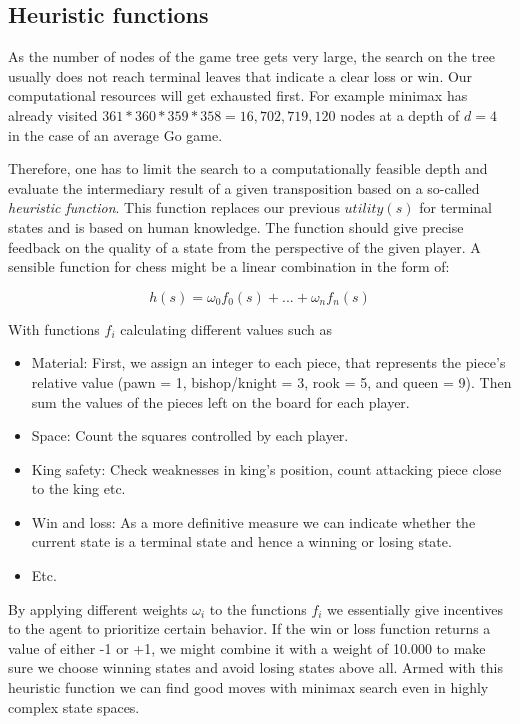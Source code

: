 \subsection{Heuristic functions}
As the number of nodes of the game tree gets very large, the search on the tree usually does not reach terminal leaves that indicate a clear loss or win. Our computational resources will get exhausted first. For example minimax has already visited $ 361 * 360 * 359 * 358 = 16,702,719,120 $ nodes at a depth of $ d = 4 $ in the case of an average Go game.

Therefore, one has to limit the search to a computationally feasible depth and evaluate the intermediary result of a given transposition based on a so-called \textit{heuristic function}. This function replaces our previous $ utility(s) $ for terminal states and is based on human knowledge. The function should give precise feedback on the quality of a state from the perspective of the given player. A sensible function for chess might be a linear combination in the form of:

$$ h(s) = \omega_0f_0(s) + ... + \omega_nf_n(s) $$

With functions $ f_i $ calculating different values such as

\begin{itemize}
    \item Material: First, we assign an integer to each piece, that represents the piece's relative value (pawn = 1, bishop/knight = 3, rook = 5, and queen = 9). Then sum the values of the pieces left on the board for each player.
    \item Space: Count the squares controlled by each player.
    \item King safety: Check weaknesses in king's position, count attacking piece close to the king etc.
    \item Win and loss: As a more definitive measure we can indicate whether the current state is a terminal state and hence a winning or losing state.
    \item Etc.
\end{itemize}

By applying different weights $ \omega_i $ to the functions $ f_i $ we essentially give incentives to the agent to prioritize certain behavior. If the win or loss function returns a value of either -1 or +1, we might combine it with a weight of 10.000 to make sure we choose winning states and avoid losing states above all. Armed with this heuristic function we can find good moves with minimax search even in highly complex state spaces.

